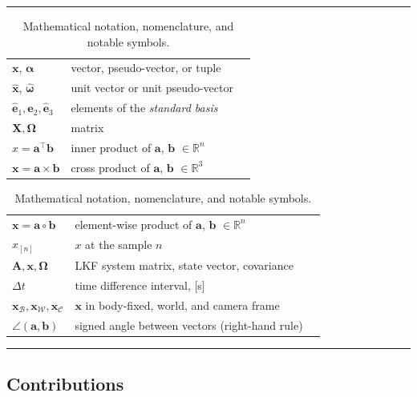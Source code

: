 \documentclass[a4paper,11pt,titlepage,twoside]{book}
\begin{document}


\begin{table}
  \scriptsize
  \centering
  \noindent\rule{\textwidth}{0.5pt}
  \begin{tabular}{lll}
    $\mathbf{x}$, $\bm{\alpha}$ & vector, pseudo-vector, or tuple\\
    $\mathbf{\hat{x}}$, $\bm{\hat{\omega}}$& unit vector or unit pseudo-vector\\
    $\mathbf{\hat{e}}_1, \mathbf{\hat{e}}_2, \mathbf{\hat{e}}_3$ & elements of the \emph{standard basis} \\
    $\mathbf{X}, \bm{\Omega}$ & matrix \\
    $x = \mathbf{a}^\intercal\mathbf{b}$ & inner product of $\mathbf{a}$, $\mathbf{b}$ $\in \mathbb{R}^n$\\
    $\mathbf{x} = \mathbf{a}\times\mathbf{b}$ & cross product of $\mathbf{a}$, $\mathbf{b}$ $\in \mathbb{R}^3$\\
  \end{tabular}%
  \begin{tabular}{lll}
    $\mathbf{x} = \mathbf{a}\circ\mathbf{b}$ & element-wise product of $\mathbf{a}$, $\mathbf{b}$ $\in \mathbb{R}^n$ \\
    $x_{[n]}$ & $x$ at the sample $n$ \\
    $\mathbf{A}, \mathbf{x}, \mathbf{\Omega}$ & LKF system matrix, state vector, covariance\\
    $\Delta t$ & time difference interval, [\si{\second}] \\
    $\mathbf{x}_\mathcal{B}, \mathbf{x}_\mathcal{W}, \mathbf{x}_\mathcal{C}$ & $\mathbf{x}$ in body-fixed, world, and camera frame \\
    $\angle\left(\mathbf{a}, \mathbf{b}\right)$ & signed angle between vectors (right-hand rule) \\
  \end{tabular}
  \noindent\rule{\textwidth}{0.5pt}
  \caption{Mathematical notation, nomenclature, and notable symbols.}
  \label{tab:nomenclature}
\end{table}



\subsection{Contributions}
\end{document}
